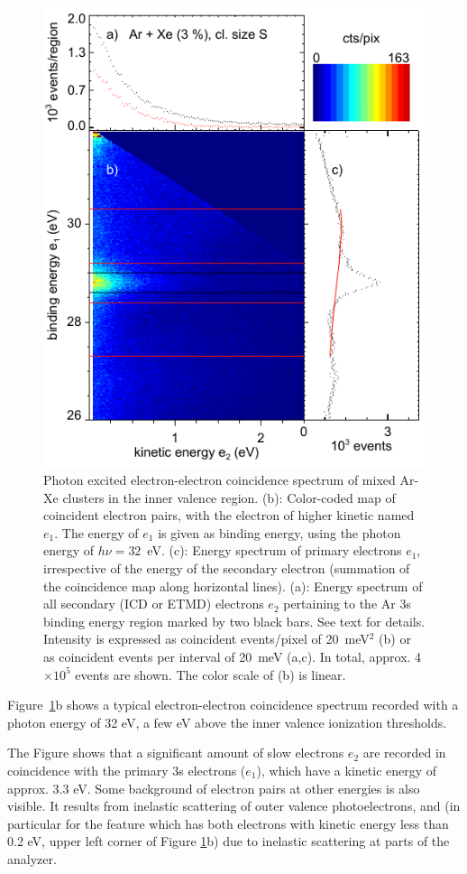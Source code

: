 \documentclass[journal=jpccck,manuscript=suppinfo]{achemso}
\begin{document}
\begin{figure}
 \centering
 \includegraphics[width=12cm]{pics/figure_map.pdf}
 \caption{
Photon excited electron-electron coincidence spectrum of mixed Ar-Xe clusters in the inner valence region. 
(b): Color-coded map of coincident electron pairs, with the electron of higher kinetic named $e_1$. 
The energy of $e_1$ is given as binding energy, using the photon energy of $h\nu = 32$~eV. 
(c): Energy spectrum of primary electrons $e_1$, irrespective of the energy of the secondary electron (summation of the coincidence map along horizontal lines). 
(a): Energy spectrum of all secondary (ICD or ETMD) electrons $e_2$ pertaining to the Ar 3s binding energy region marked by two black bars. 
See text for details. 
Intensity is expressed as coincident events/pixel of 20~meV$^2$ (b) or as coincident events per interval of 20~meV (a,c). 
In total, approx. 4$\times 10^5$ events are shown. 
The color scale of (b) is linear.
 \label{figure:map}
 }
\end{figure}
%
Figure\ \ref{figure:map}b shows a typical electron-electron coincidence spectrum recorded with a photon energy of 32 eV, a few eV above the inner valence ionization thresholds.

The Figure shows that a significant amount of slow electrons $e_2$ are recorded in coincidence with the primary 3s electrons ($e_1$), which have a kinetic energy of approx. 3.3 eV. 
Some background of electron pairs at other energies is also visible.
It results from inelastic scattering of outer valence photoelectrons, and (in particular for the feature which has both electrons with kinetic energy less than 0.2 eV, upper left corner of Figure \ref{figure:map}b) due to inelastic scattering at parts of the analyzer.
\end{document}
